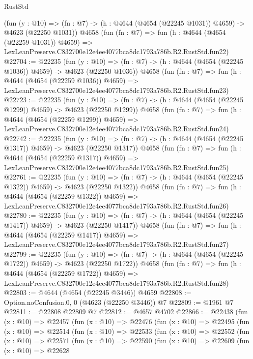 \begin{lexlean}{RustStd}
\begin{coremodule}
    (fun (y : @10) => (fn : @7) -> (h : @4644 (@4654 (@22245 @1031)) @4659) -> @4623 (@22250 @1031))
    @4658
    (fun (fn : @7) =>
    fun (h : @4644 (@4654 (@22259 @1031)) @4659) =>
    LexLeanPreserve.C832700e12e4ee4077bca8dc1793a786b.R2.RustStd.fun22)
@22704 := @22235
    (fun (y : @10) => (fn : @7) -> (h : @4644 (@4654 (@22245 @1036)) @4659) -> @4623 (@22250 @1036))
    @4658
    (fun (fn : @7) =>
    fun (h : @4644 (@4654 (@22259 @1036)) @4659) =>
    LexLeanPreserve.C832700e12e4ee4077bca8dc1793a786b.R2.RustStd.fun23)
@22723 := @22235
    (fun (y : @10) => (fn : @7) -> (h : @4644 (@4654 (@22245 @1299)) @4659) -> @4623 (@22250 @1299))
    @4658
    (fun (fn : @7) =>
    fun (h : @4644 (@4654 (@22259 @1299)) @4659) =>
    LexLeanPreserve.C832700e12e4ee4077bca8dc1793a786b.R2.RustStd.fun24)
@22742 := @22235
    (fun (y : @10) => (fn : @7) -> (h : @4644 (@4654 (@22245 @1317)) @4659) -> @4623 (@22250 @1317))
    @4658
    (fun (fn : @7) =>
    fun (h : @4644 (@4654 (@22259 @1317)) @4659) =>
    LexLeanPreserve.C832700e12e4ee4077bca8dc1793a786b.R2.RustStd.fun25)
@22761 := @22235
    (fun (y : @10) => (fn : @7) -> (h : @4644 (@4654 (@22245 @1322)) @4659) -> @4623 (@22250 @1322))
    @4658
    (fun (fn : @7) =>
    fun (h : @4644 (@4654 (@22259 @1322)) @4659) =>
    LexLeanPreserve.C832700e12e4ee4077bca8dc1793a786b.R2.RustStd.fun26)
@22780 := @22235
    (fun (y : @10) => (fn : @7) -> (h : @4644 (@4654 (@22245 @1417)) @4659) -> @4623 (@22250 @1417))
    @4658
    (fun (fn : @7) =>
    fun (h : @4644 (@4654 (@22259 @1417)) @4659) =>
    LexLeanPreserve.C832700e12e4ee4077bca8dc1793a786b.R2.RustStd.fun27)
@22799 := @22235
    (fun (y : @10) => (fn : @7) -> (h : @4644 (@4654 (@22245 @1722)) @4659) -> @4623 (@22250 @1722))
    @4658
    (fun (fn : @7) =>
    fun (h : @4644 (@4654 (@22259 @1722)) @4659) =>
    LexLeanPreserve.C832700e12e4ee4077bca8dc1793a786b.R2.RustStd.fun28)
@22803 := @4644 (@4654 (@22245 @3446)) @4659
@22808 := Option.noConfusion.{0, 0} (@4623 (@22250 @3446)) @7
@22809 := @1961 @7
@22811 := @22808 @22809 @7
@22812 := @4657 @4702
@22866 := @22438
    (fun (x : @10) =>
    @22457
      (fun (x : @10) =>
      @22476
        (fun (x : @10) =>
        @22495
          (fun (x : @10) =>
          @22514
            (fun (x : @10) =>
            @22533
              (fun (x : @10) =>
              @22552
                (fun (x : @10) =>
                @22571
                  (fun (x : @10) =>
                  @22590
                    (fun (x : @10) =>
                    @22609
                      (fun (x : @10) =>
                      @22628

\end{coremodule}
\end{lexlean}
